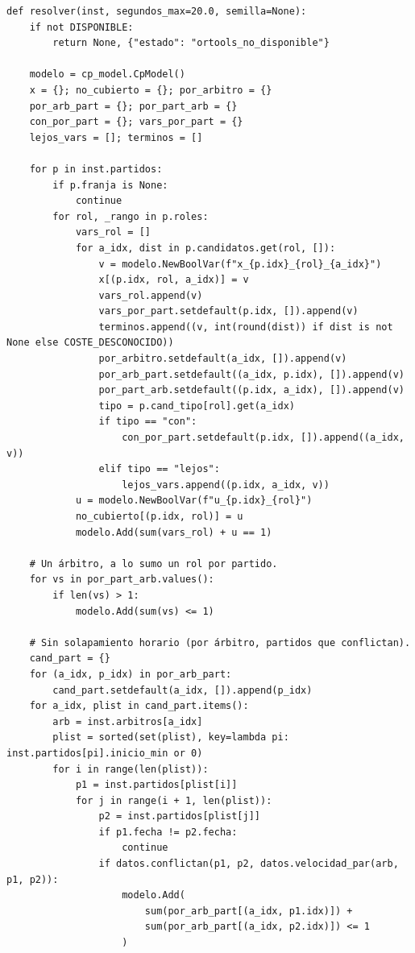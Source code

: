 \documentclass[11pt,a4paper,spanish]{book}
\numberwithin{equation}{chapter}
\numberwithin{figure}{chapter}
\numberwithin{table}{chapter}
\begin{document}
\begin{lstlisting}[caption={\texttt{cpsat.py} --- construcción y resolución del modelo de programación con restricciones.}]
def resolver(inst, segundos_max=20.0, semilla=None):
    if not DISPONIBLE:
        return None, {"estado": "ortools_no_disponible"}

    modelo = cp_model.CpModel()
    x = {}; no_cubierto = {}; por_arbitro = {}
    por_arb_part = {}; por_part_arb = {}
    con_por_part = {}; vars_por_part = {}
    lejos_vars = []; terminos = []

    for p in inst.partidos:
        if p.franja is None:
            continue
        for rol, _rango in p.roles:
            vars_rol = []
            for a_idx, dist in p.candidatos.get(rol, []):
                v = modelo.NewBoolVar(f"x_{p.idx}_{rol}_{a_idx}")
                x[(p.idx, rol, a_idx)] = v
                vars_rol.append(v)
                vars_por_part.setdefault(p.idx, []).append(v)
                terminos.append((v, int(round(dist)) if dist is not None else COSTE_DESCONOCIDO))
                por_arbitro.setdefault(a_idx, []).append(v)
                por_arb_part.setdefault((a_idx, p.idx), []).append(v)
                por_part_arb.setdefault((p.idx, a_idx), []).append(v)
                tipo = p.cand_tipo[rol].get(a_idx)
                if tipo == "con":
                    con_por_part.setdefault(p.idx, []).append((a_idx, v))
                elif tipo == "lejos":
                    lejos_vars.append((p.idx, a_idx, v))
            u = modelo.NewBoolVar(f"u_{p.idx}_{rol}")
            no_cubierto[(p.idx, rol)] = u
            modelo.Add(sum(vars_rol) + u == 1)

    # Un árbitro, a lo sumo un rol por partido.
    for vs in por_part_arb.values():
        if len(vs) > 1:
            modelo.Add(sum(vs) <= 1)

    # Sin solapamiento horario (por árbitro, partidos que conflictan).
    cand_part = {}
    for (a_idx, p_idx) in por_arb_part:
        cand_part.setdefault(a_idx, []).append(p_idx)
    for a_idx, plist in cand_part.items():
        arb = inst.arbitros[a_idx]
        plist = sorted(set(plist), key=lambda pi: inst.partidos[pi].inicio_min or 0)
        for i in range(len(plist)):
            p1 = inst.partidos[plist[i]]
            for j in range(i + 1, len(plist)):
                p2 = inst.partidos[plist[j]]
                if p1.fecha != p2.fecha:
                    continue
                if datos.conflictan(p1, p2, datos.velocidad_par(arb, p1, p2)):
                    modelo.Add(
                        sum(por_arb_part[(a_idx, p1.idx)]) +
                        sum(por_arb_part[(a_idx, p2.idx)]) <= 1
                    )


\end{lstlisting}
\end{document}
